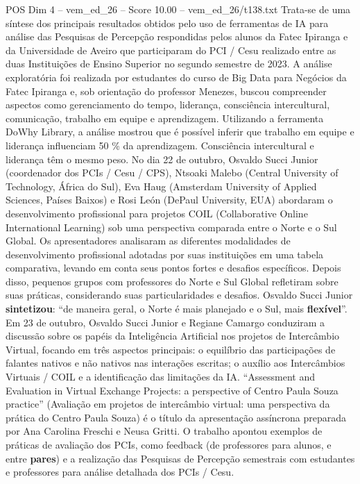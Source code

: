 \begin{textsample}{POS Dim 4 – vem\_ed\_26 – Score 10.00 – vem\_ed\_26/t138.txt}
Trata-se de uma síntese dos principais resultados obtidos pelo uso de ferramentas de IA para análise das Pesquisas de Percepção respondidas pelos alunos da Fatec Ipiranga e da Universidade de Aveiro que participaram do PCI / Cesu realizado entre as duas Instituições de Ensino Superior no segundo semestre de 2023.
A análise exploratória foi realizada por estudantes do curso de Big Data para Negócios da Fatec Ipiranga e, sob orientação do professor Menezes, buscou compreender aspectos como gerenciamento do tempo, liderança, consciência intercultural, comunicação, trabalho em equipe e aprendizagem.
Utilizando a ferramenta DoWhy Library, a análise mostrou que é possível inferir que trabalho em equipe e liderança influenciam 50 \% da aprendizagem.
Consciência intercultural e liderança têm o mesmo peso.
No dia 22 de outubro, Osvaldo Succi Junior (coordenador dos PCIs / Cesu / CPS), Ntsoaki Malebo (Central University of Technology, África do Sul), Eva Haug (Amsterdam University of Applied Sciences, Países Baixos) e Rosi León (DePaul University, EUA) abordaram o desenvolvimento profissional para projetos COIL (Collaborative Online International Learning) sob uma perspectiva comparada entre o Norte e o Sul Global.
Os apresentadores analisaram as diferentes modalidades de desenvolvimento profissional adotadas por suas instituições em uma tabela comparativa, levando em conta seus pontos fortes e desafios específicos.
Depois disso, pequenos grupos com professores do Norte e Sul Global refletiram sobre suas práticas, considerando suas particularidades e desafios.
Osvaldo Succi Junior \textbf{sintetizou}: “de maneira geral, o Norte é mais planejado e o Sul, mais \textbf{flexível}”.
Em 23 de outubro, Osvaldo Succi Junior e Regiane Camargo conduziram a discussão sobre os papéis da Inteligência Artificial nos projetos de Intercâmbio Virtual, focando em três aspectos principais: o equilíbrio das participações de falantes nativos e não nativos nas interações escritas; o auxílio aos Intercâmbios Virtuais / COIL e a identificação das limitações da IA. “Assessment and Evaluation in Virtual Exchange Projects: a perspective of Centro Paula Souza practice” (Avaliação em projetos de intercâmbio virtual: uma perspectiva da prática do Centro Paula Souza) é o título da apresentação assíncrona preparada por Ana Carolina Freschi e Neusa Gritti.
O trabalho apontou exemplos de práticas de avaliação dos PCIs, como feedback (de professores para alunos, e entre \textbf{pares}) e a realização das Pesquisas de Percepção semestrais com estudantes e professores para análise detalhada dos PCIs / Cesu.

\end{textsample}
